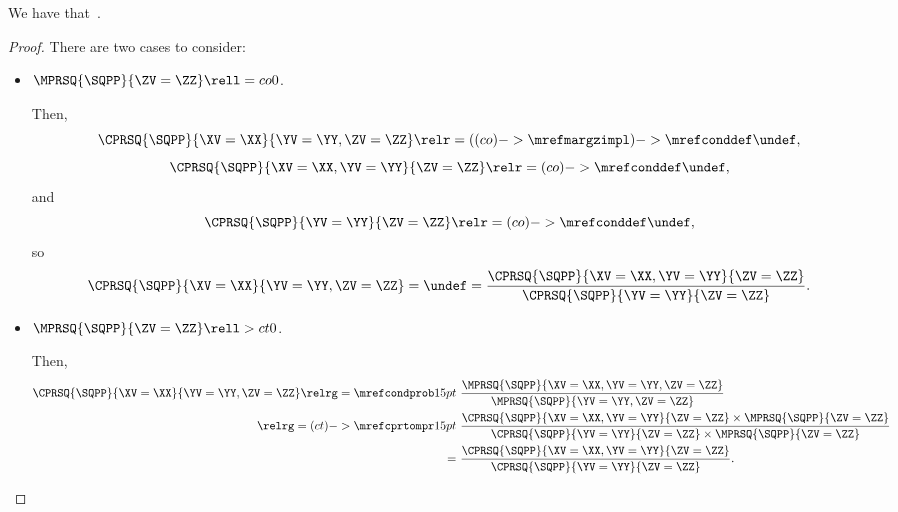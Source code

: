 \begin{proposition}
  We have that\ \sqcpcprobexprprop.%
\end{proposition}

\begin{proof}
  There are two cases to consider:
  \begin{itemize}
    \item {} $\MPRSQ{\SQPP}{\ZV = \ZZ} \rell = co 0$.

      Then,
      $$\CPRSQ{\SQPP}{\XV = \XX}{\YV = \YY, \ZV = \ZZ} \relr = {((co)->\mrefmargzimpl)->\mrefconddef} \undef,$$
      $$\CPRSQ{\SQPP}{\XV = \XX, \YV = \YY}{\ZV = \ZZ} \relr = {(co)->\mrefconddef} \undef,$$
      and
      $$\CPRSQ{\SQPP}{\YV = \YY}{\ZV = \ZZ} \relr = {(co)->\mrefconddef} \undef,$$
      so
      \begin{align*}
        \CPRSQ{\SQPP}{\XV = \XX}{\YV = \YY, \ZV = \ZZ} 
        = \undef =
        \frac{\CPRSQ{\SQPP}{\XV = \XX, \YV = \YY}{\ZV = \ZZ}}{\CPRSQ{\SQPP}{\YV = \YY}{\ZV = \ZZ}}.
      \end{align*}
    \item {} $\MPRSQ{\SQPP}{\ZV = \ZZ} \rell > ct 0$.
      
      Then,
      \begin{align*}
        \CPRSQ{\SQPP}{\XV = \XX}{\YV = \YY, \ZV = \ZZ} 
        \relrg = {\mrefcondprob} 15pt \ & 
        \frac{\MPRSQ{\SQPP}{\XV = \XX, \YV = \YY, \ZV = \ZZ}}{\MPRSQ{\SQPP}{\YV = \YY, \ZV = \ZZ}}\\
        \relrg = {(ct)->\mrefcprtompr} 15pt \ &
        \frac{\CPRSQ{\SQPP}{\XV = \XX, \YV = \YY}{\ZV = \ZZ}\times\MPRSQ{\SQPP}{\ZV =\ZZ}}{\CPRSQ{\SQPP}{\YV = \YY}{\ZV = \ZZ}\times\MPRSQ{\SQPP}{\ZV =\ZZ}}\\
        =\ &
        \frac{\CPRSQ{\SQPP}{\XV = \XX, \YV = \YY}{\ZV = \ZZ}}{\CPRSQ{\SQPP}{\YV = \YY}{\ZV = \ZZ}}.
      \end{align*}
  \end{itemize}
\end{proof}
